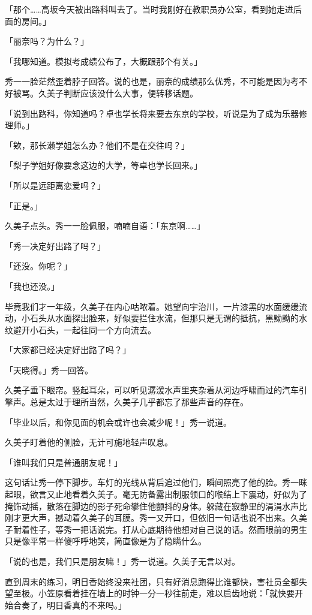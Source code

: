 \documentclass[UTF8]{ctexart}
\begin{document}
    「那个……高坂今天被出路科叫去了。当时我刚好在教职员办公室，看到她走进后面的房间。」 

    「丽奈吗？为什么？」 

    「我哪知道。模拟考成绩公布了，大概跟那个有关。」 

    秀一一脸茫然歪着脖子回答。说的也是，丽奈的成绩那么优秀，不可能是因为考不好被骂。久美子判断应该没什么大事，便转移话题。 

    「说到出路科，你知道吗？卓也学长将来要去东京的学校，听说是为了成为乐器修理师。」 

    「欸，那长濑学姐怎么办？他们不是在交往吗？」 

    「梨子学姐好像要念这边的大学，等卓也学长回来。」 

    「所以是远距离恋爱吗？」 

    「正是。」 

    久美子点头。秀一一脸佩服，喃喃自语：「东京啊……」 

    「秀一决定好出路了吗？」 

    「还没。你呢？」 

    「我也还没。」 

    毕竟我们才一年级，久美子在内心咕哝着。她望向宇治川，一片漆黑的水面缓缓流动，小石头从水面探出脸来，好似要拦住水流，但那只是无谓的抵抗，黑黝黝的水纹避开小石头，一起往同一个方向流去。 

    「大家都已经决定好出路了吗？」 

    「天晓得。」秀一回答。 

    久美子垂下眼帘。竖起耳朵，可以听见潺湲水声里夹杂着从河边呼啸而过的汽车引擎声。总是太过于理所当然，久美子几乎都忘了那些声音的存在。 

    「毕业以后，和你见面的机会或许也会减少呢！」秀一说道。 

    久美子盯着他的侧脸，无计可施地轻声叹息。 

    「谁叫我们只是普通朋友呢！」 

    这句话让秀一停下脚步。车灯的光线从背后追过他们，瞬间照亮了他的脸。秀一眯起眼，欲言又止地看着久美子。毫无防备露出制服领口的喉结上下震动，好似为了掩饰动摇，散落在脚边的影子死命攀住他颤抖的身体。躲藏在寂静里的涓涓水声比刚才更大声，撼动着久美子的耳膜。秀一又开口，但依旧一句话也说不出来。久美子耐着性子，等秀一把话说完。打从心底期待他想对自己说的话。然而眼前的男生只是像平常一样傻呼呼地笑，简直像是为了隐瞒什么。 

    「说的也是，我们只是朋友嘛！」秀一说道。久美子无言以对。 

    直到周末的练习，明日香始终没来社团，只有好消息跑得比谁都快，害社员全都失望至极。小笠原看着挂在墙上的时钟一分一秒往前走，难以启齿地说：「就快要开始合奏了，明日香真的不来吗。」 
\end{document}
